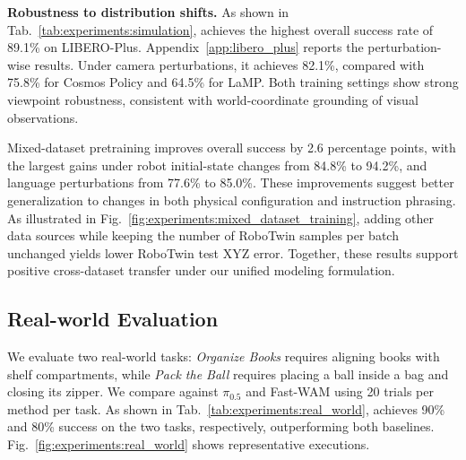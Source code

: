 \noindent\textbf{Robustness to distribution shifts.}
As shown in Tab.~\ref{tab:experiments:simulation}, \method{}
achieves the highest overall success rate of 89.1\%
on LIBERO-Plus. Appendix~\ref{app:libero_plus} reports the perturbation-wise results.
Under camera perturbations, it achieves 82.1\%, compared with 75.8\%
for Cosmos Policy and 64.5\% for LaMP. Both training settings show
strong viewpoint robustness, consistent with world-coordinate grounding
of visual observations.

Mixed-dataset pretraining improves overall success by 2.6 percentage points, with the largest gains under robot initial-state changes from 84.8\% to 94.2\%, and language perturbations from 77.6\% to 85.0\%. These improvements suggest better generalization to changes in both physical configuration and instruction phrasing.
As illustrated in Fig.~\ref{fig:experiments:mixed_dataset_training},
adding other data sources while keeping the number of RoboTwin samples per batch unchanged yields lower RoboTwin test XYZ error.
Together, these results support positive cross-dataset transfer
under our unified modeling formulation.

\vspace{-0.2cm}

\subsection{Real-world Evaluation}
\label{sec:experiments:real_world}
\vspace{-0.2cm}

We evaluate two real-world tasks: \emph{Organize Books} requires aligning
books with shelf compartments, while \emph{Pack the Ball} requires placing
a ball inside a bag and closing its zipper. We compare against $\pi_{0.5}$
and Fast-WAM using 20 trials per method per task.
As shown in Tab.~\ref{tab:experiments:real_world}, \method{} achieves
90\% and 80\% success on the two tasks, respectively, outperforming
both baselines.
Fig.~\ref{fig:experiments:real_world} shows representative executions.

